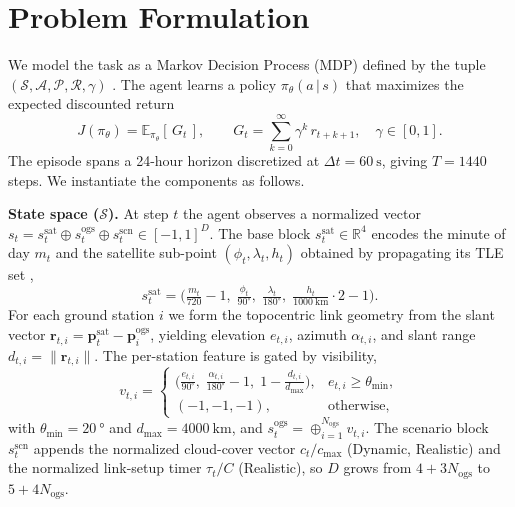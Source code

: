 \documentclass[manuscript, review, nonacm]{acmart}
\begin{document}
\section{Problem Formulation}\label{sec:formulation}
We model the task as a Markov Decision Process (MDP) defined by the tuple $(\mathcal{S}, \mathcal{A}, \mathcal{P}, \mathcal{R}, \gamma)$ \cite{sutton2018reinforcement}. The agent learns a policy $\pi_\theta(a\,|\,s)$ that maximizes the expected discounted return
\begin{equation}
J(\pi_\theta) = \mathbb{E}_{\pi_\theta}\!\left[\, G_t \,\right], \qquad
G_t = \sum_{k=0}^{\infty} \gamma^{k}\, r_{t+k+1}, \quad \gamma \in [0,1].
\label{eq:return}
\end{equation}
The episode spans a 24-hour horizon discretized at $\Delta t = \SI{60}{\second}$, giving $T = 1440$ steps. We instantiate the components as follows.

\textbf{State space ($\mathcal{S}$).} At step $t$ the agent observes a normalized vector $s_t = s_t^{\text{sat}} \oplus s_t^{\text{ogs}} \oplus s_t^{\text{scn}} \in [-1,1]^{D}$. The base block $s_t^{\text{sat}} \in \mathbb{R}^4$ encodes the minute of day $m_t$ and the satellite sub-point $(\phi_t,\lambda_t,h_t)$ obtained by propagating its TLE set \cite{vallado2001fundamentals},
\begin{equation}
s_t^{\text{sat}} = \Big(\tfrac{m_t}{720}-1,\; \tfrac{\phi_t}{90^\circ},\; \tfrac{\lambda_t}{180^\circ},\; \tfrac{h_t}{\SI{1000}{\km}}\!\cdot 2 - 1\Big).
\label{eq:statesat}
\end{equation}
For each ground station $i$ we form the topocentric link geometry from the slant vector $\mathbf{r}_{t,i} = \mathbf{p}^{\text{sat}}_t - \mathbf{p}^{\text{ogs}}_i$, yielding elevation $e_{t,i}$, azimuth $\alpha_{t,i}$, and slant range $d_{t,i}=\lVert \mathbf{r}_{t,i}\rVert$. The per-station feature is gated by visibility,
\begin{equation}
v_{t,i} =
\begin{cases}
\big(\tfrac{e_{t,i}}{90^\circ},\; \tfrac{\alpha_{t,i}}{180^\circ}-1,\; 1-\tfrac{d_{t,i}}{d_{\max}}\big), & e_{t,i} \ge \theta_{\min},\\[2pt]
(-1,-1,-1), & \text{otherwise},
\end{cases}
\label{eq:statelink}
\end{equation}
with $\theta_{\min}=\SI{20}{\degree}$ and $d_{\max}=\SI{4000}{\km}$, and $s_t^{\text{ogs}} = \oplus_{i=1}^{N_{\text{ogs}}} v_{t,i}$. The scenario block $s_t^{\text{scn}}$ appends the normalized cloud-cover vector $c_t/c_{\max}$ (Dynamic, Realistic) and the normalized link-setup timer $\tau_t/C$ (Realistic), so $D$ grows from $4+3N_{\text{ogs}}$ to $5+4N_{\text{ogs}}$.
\end{document}
